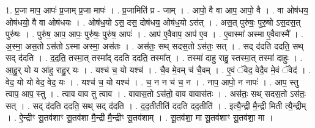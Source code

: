 \documentclass[17pt]{extarticle}
\begin{document}
1. प्र॒जा माप॒ आपः॑ प्र॒जाम् प्र॒जा मापः॑ । . प्र॒जामिति॑ प्र - जाम् । . आपो॒ वै वा आप॒ आपो॒ वै । . वा ओष॑धय॒ ओष॑धयो॒ वै वा ओष॑धयः । . ओष॑ध॒यो ऽस॒ दस॒ दोष॑धय॒ ओष॑ध॒यो ऽस॑त् । . अस॒त् पुरु॑षः॒ पुरु॒षो ऽस॒दस॒त् पुरु॑षः । . पुरु॑ष॒ आप॒ आपः॒ पुरु॑षः॒ पुरु॑ष॒ आपः॑ । . आप॑ ए॒वैवाप॒ आप॑ ए॒व । . ए॒वास्मा॑ अस्मा ए॒वैवास्मै᳚ । . अ॒स्मा॒ अस॒तो ऽस॑तो ऽस्मा अस्मा॒ अस॑तः । . अस॑तः॒ सथ् सदस॒तो ऽस॑तः॒ सत् । . सद् द॑दति ददति॒ सथ् सद् द॑दति । . द॒द॒ति॒ तस्मा॒त् तस्मा᳚द् ददति ददति॒ तस्मा᳚त् । . तस्मा॑ दाहु राहु॒ स्तस्मा॒त् तस्मा॑ दाहुः । . आ॒हु॒र् यो य आ॑हु राहु॒र् यः । . यश्च॑ च॒ यो यश्च॑ । . चै॒व मे॒वम् च॑ चै॒वम् । . ए॒वं ॅवेद॒ वेदै॒व मे॒वं ॅवेद॑ । . वेद॒ यो यो वेद॒ वेद॒ यः । . यश्च॑ च॒ यो यश्च॑ । . च॒ न न च॑ च॒ न । . नाप॒ आपो॒ न नापः॑ । . आप॒ स्तु त्वाप॒ आप॒ स्तु । . त्वाव वाव तु त्वाव । . वावास॒तो ऽस॑तो॒ वाव वावास॑तः । . अस॑तः॒ सथ् सदस॒तो ऽस॑तः॒ सत् । . सद् द॑दति ददति॒ सथ् सद् द॑दति । . द॒द॒तीतीति॑ ददति दद॒तीति॑ । . इत्यै॒न्द्री मै॒न्द्री मिती त्यै॒न्द्रीम् । . ऐ॒न्द्रीꣳ सू॒तव॑शाꣳ सू॒तव॑शा मै॒न्द्री मै॒न्द्रीꣳ सू॒तव॑शाम् । . सू॒तव॑शा॒ मा सू॒तव॑शाꣳ सू॒तव॑शा॒ मा । \newline
\end{document}
